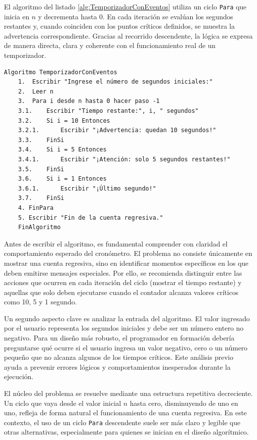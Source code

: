 \documentclass[12pt,twoside]{book}
\begin{document}
						El algoritmo del listado \ref{alg:TemporizadorConEventos} utiliza un ciclo \texttt{Para} que inicia en \( n \) y decrementa hasta 0. En cada iteración se evalúan los segundos restantes y, cuando coinciden con los puntos críticos definidos, se muestra la advertencia correspondiente. Gracias al recorrido descendente, la lógica se expresa de manera directa, clara y coherente con el funcionamiento real de un temporizador.
						
						\begin{lstlisting}[style=upsamStyle,caption={Cuenta regresiva con avisos en tiempos críticos},label={alg:TemporizadorConEventos}]
	Algoritmo TemporizadorConEventos
	1.  Escribir "Ingrese el número de segundos iniciales:"
	2.  Leer n
	3.  Para i desde n hasta 0 hacer paso -1
	3.1.	Escribir "Tiempo restante:", i, " segundos"
	3.2.	Si i = 10 Entonces
	3.2.1.		Escribir "¡Advertencia: quedan 10 segundos!"
	3.3.	FinSi
	3.4.	Si i = 5 Entonces
	3.4.1.		Escribir "¡Atención: solo 5 segundos restantes!"
	3.5.	FinSi
	3.6.	Si i = 1 Entonces
	3.6.1.		Escribir "¡Último segundo!"
	3.7.	FinSi
	4. FinPara
	5. Escribir "Fin de la cuenta regresiva."
	FinAlgoritmo \end{lstlisting}
						
						\noindent
						Antes de escribir el algoritmo, es fundamental comprender con claridad el comportamiento esperado del cronómetro. El problema no consiste únicamente en mostrar una cuenta regresiva, sino en identificar momentos específicos en los que deben emitirse mensajes especiales. Por ello, se recomienda distinguir entre las acciones que ocurren en cada iteración del ciclo (mostrar el tiempo restante) y aquellas que solo deben ejecutarse cuando el contador alcanza valores críticos como 10, 5 y 1 segundo.
						
						Un segundo aspecto clave es analizar la entrada del algoritmo. El valor ingresado por el usuario representa los segundos iniciales y debe ser un número entero no negativo. Para un diseño más robusto, el programador en formación debería preguntarse qué ocurre si el usuario ingresa un valor negativo, cero o un número pequeño que no alcanza algunos de los tiempos críticos. Este análisis previo ayuda a prevenir errores lógicos y comportamientos inesperados durante la ejecución.
						
						El núcleo del problema se resuelve mediante una estructura repetitiva decreciente. Un ciclo que vaya desde el valor inicial \(n\) hasta cero, disminuyendo de uno en uno, refleja de forma natural el funcionamiento de una cuenta regresiva. En este contexto, el uso de un ciclo \texttt{Para} descendente suele ser más claro y legible que otras alternativas, especialmente para quienes se inician en el diseño algorítmico.
						
\end{document}
